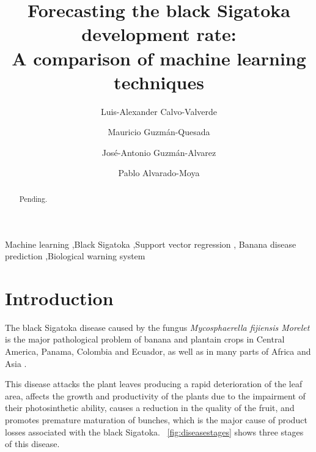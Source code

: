 \documentclass[review,authoryear,english]{elsarticle}
\begin{document}
\begin{frontmatter}

\title{Forecasting the black Sigatoka development rate:\\ A comparison of machine learning techniques 
}

\author[afiLuisAlex]{Luis-Alexander Calvo-Valverde}

\author[afiCorbana] {Mauricio Guzmán-Quesada}
\author[afiCorbana]{José-Antonio Guzmán-Alvarez}
\author[afiPablo]{Pablo Alvarado-Moya}

\address[afiLuisAlex]{DOCINADE, Instituto Tecnológico de Costa Rica, 
Computer Research Center, Multidisciplinar program eScience, Cartago, Costa Rica}

\address[afiCorbana]{Dirección de Investigaciones, Corporación Bananera Nacional S.A., Guápiles, Costa Rica}

\address[afiPablo]{DOCINADE, Instituto Tecnológico de Costa Rica, Cartago, Costa Rica}

\begin{abstract}
Pending.
\end{abstract}

\begin{keyword}
Machine learning \sep Black Sigatoka \sep Support vector regression \sep
Banana disease prediction \sep Biological warning system 
\end{keyword}

\end{frontmatter}

\linenumbers

\section{Introduction}


The black Sigatoka disease caused by the fungus \emph{Mycosphaerella
  fijiensis Morelet} is the major pathological problem of banana and
plantain crops in Central America, Panama, Colombia and Ecuador, as well as in
many parts of Africa and Asia \citep{MarinVargas1995}.

This disease attacks the plant leaves producing a rapid deterioration
of the leaf area, affects the growth and productivity of the plants
due to the impairment of their photosinthetic ability, causes a
reduction in the quality of the fruit, and promotes premature
maturation  of bunches, which is
the major cause of product losses associated with the black
Sigatoka. \figurename~\ref{fig:diseasestages} shows three stages of
this disease.
\end{document}
